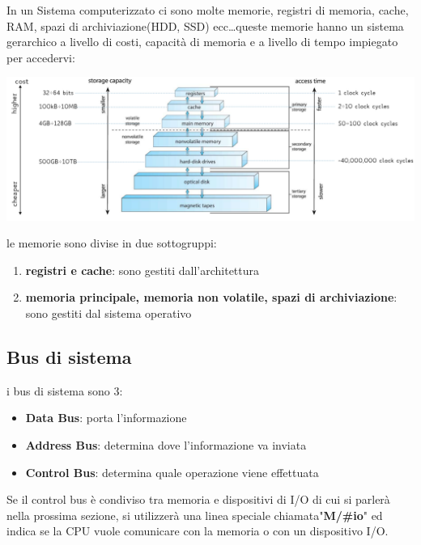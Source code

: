 \documentclass{article}
\begin{document}
        In un Sistema computerizzato ci sono molte memorie, registri di memoria, cache, RAM, spazi di archiviazione(HDD, SSD) ecc\ldots queste memorie hanno un sistema gerarchico a livello di costi, capacità di memoria e a livello di tempo impiegato per accedervi:

        \begin{center}
            \includegraphics[width=1\textwidth]{immagini/gerarchia memorie.png}
        \end{center}
        le memorie sono divise in due sottogruppi:
        \begin{enumerate}
            \item \textbf{registri e cache}:
            sono gestiti dall'architettura

            \item \textbf{memoria principale, memoria non volatile, spazi di archiviazione}:
            sono gestiti dal sistema operativo
        \end{enumerate}

    \subsection{Bus di sistema}
        i bus di sistema sono 3:

        \begin{itemize}
            \item \textbf{Data Bus}:
            porta l'informazione

            \item \textbf{Address Bus}:
            determina dove l'informazione va inviata

            \item \textbf{Control Bus}:
            determina quale operazione viene effettuata
        \end{itemize}
%
        Se il control bus è condiviso tra memoria e dispositivi di I/O di cui si parlerà nella prossima sezione, si utilizzerà una linea speciale chiamata"\textbf{M/\#io}" ed indica se la CPU vuole comunicare con la memoria o con un dispositivo I/O.
\end{document}
